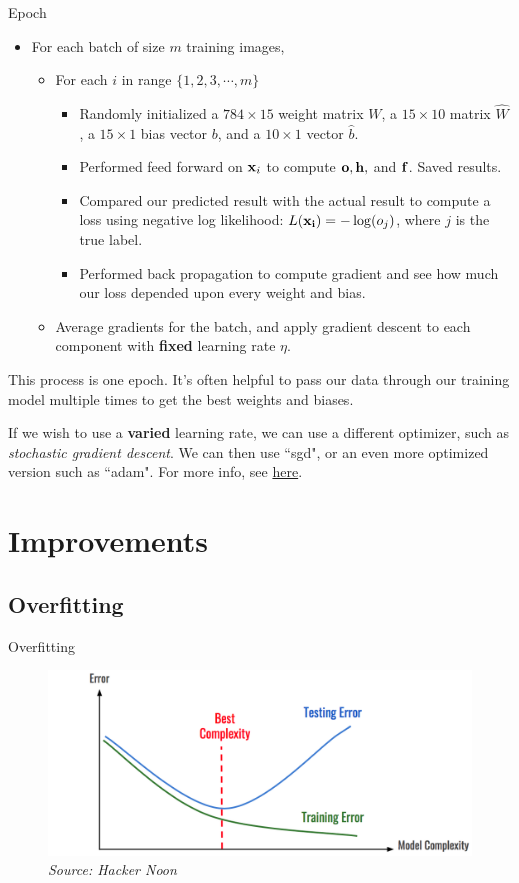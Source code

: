 \documentclass[xcolor=dvipsnames, fontsize=11pt, %
pagesize, %
parskip=half-, t]{beamer}
\begin{document}
\begin{frame}{Epoch}
\begin{itemize}
\item For each batch of size $m$ training images,
\begin{itemize}
\item For each $i$ in range $\{1, 2, 3, \cdots, m\}$  
\begin{itemize}
\item Randomly initialized a $784\times 15$ weight matrix $W$, a $15\times 10$ matrix $\hat{W}$, a $15\times 1$ bias vector $b$, and a $10\times 1$ vector $\hat{b}$.
\item Performed feed forward on $\bold{x}_i$ to compute $\bold{o}, \bold{h},$ and $\bold{f}$. Saved results.  
\item Compared our predicted result with the actual result to compute a loss using negative log likelihood: $L(\bold{x_i})=-\log(o_j)$, where $j$ is the true label.  
\item Performed back propagation to compute gradient and see how much our loss depended upon every weight and bias.   
\end{itemize}
\item Average gradients for the batch, and apply gradient descent to each component with \textbf{fixed} learning rate $\eta$. 
\end{itemize}
\end{itemize}
This process is one epoch. It's often helpful to pass our data through our training model multiple times to get the best weights and biases.  

\vspace{0.025\textheight} 
If we wish to use a \textbf{varied} learning rate, we can use a different optimizer, such as \textit{stochastic gradient descent}. We can then use ``sgd", or an even more optimized version such as ``adam". For more info, see \href{https://en.wikipedia.org/wiki/Stochastic_gradient_descent\#Adam}{here}.
\end{frame}

\section{Improvements}
\subsection{Overfitting}
\begin{frame}{Overfitting}
\begin{figure}[H]
\includegraphics[scale=0.33]{overfitting.png}
\caption{\textit{Source: Hacker Noon}}
\end{figure}
\end{frame}
\end{document}

